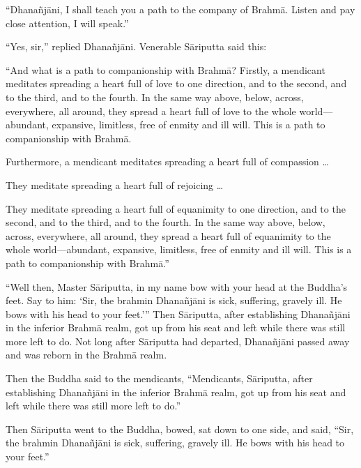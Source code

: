 \documentclass[12pt,openany]{book}%
\begin{document}
“\textsanskrit{Dhanañjāni}, I shall teach you a path to the company of \textsanskrit{Brahmā}. Listen and pay close attention, I will speak.” 

“Yes, sir,” replied \textsanskrit{Dhanañjāni}. Venerable \textsanskrit{Sāriputta} said this: 

“And what is a path to companionship with \textsanskrit{Brahmā}? Firstly, a mendicant meditates spreading a heart full of love to one direction, and to the second, and to the third, and to the fourth. In the same way above, below, across, everywhere, all around, they spread a heart full of love to the whole world—abundant, expansive, limitless, free of enmity and ill will. This is a path to companionship with \textsanskrit{Brahmā}. 

Furthermore, a mendicant meditates spreading a heart full of compassion … 

They meditate spreading a heart full of rejoicing … 

They meditate spreading a heart full of equanimity to one direction, and to the second, and to the third, and to the fourth. In the same way above, below, across, everywhere, all around, they spread a heart full of equanimity to the whole world—abundant, expansive, limitless, free of enmity and ill will. This is a path to companionship with \textsanskrit{Brahmā}.” 

“Well then, Master \textsanskrit{Sāriputta}, in my name bow with your head at the Buddha’s feet. Say to him: ‘Sir, the brahmin \textsanskrit{Dhanañjāni} is sick, suffering, gravely ill. He bows with his head to your feet.’” Then \textsanskrit{Sāriputta}, after establishing \textsanskrit{Dhanañjāni} in the inferior \textsanskrit{Brahmā} realm, got up from his seat and left while there was still more left to do. Not long after \textsanskrit{Sāriputta} had departed, \textsanskrit{Dhanañjāni} passed away and was reborn in the \textsanskrit{Brahmā} realm. 

Then the Buddha said to the mendicants, “Mendicants, \textsanskrit{Sāriputta}, after establishing \textsanskrit{Dhanañjāni} in the inferior \textsanskrit{Brahmā} realm, got up from his seat and left while there was still more left to do.” 

Then \textsanskrit{Sāriputta} went to the Buddha, bowed, sat down to one side, and said, “Sir, the brahmin \textsanskrit{Dhanañjāni} is sick, suffering, gravely ill. He bows with his head to your feet.” 
\end{document}
